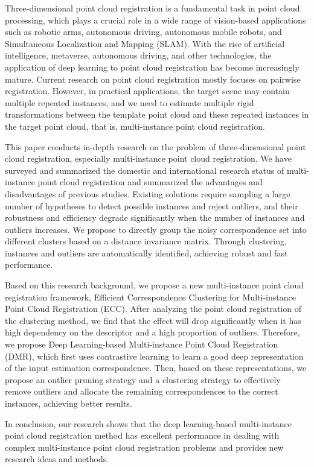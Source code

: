 \begin{abstractEn}
    Three-dimensional point cloud registration is a fundamental task in point cloud processing, which plays a crucial role in a wide range of vision-based applications such as robotic arms, autonomous driving, autonomous mobile robots, and Simultaneous Localization and Mapping (SLAM). With the rise of artificial intelligence, metaverse, autonomous driving, and other technologies, the application of deep learning to point cloud registration has become increasingly mature. Current research on point cloud registration mostly focuses on pairwise registration. However, in practical applications, the target scene may contain multiple repeated instances, and we need to estimate multiple rigid transformations between the template point cloud and these repeated instances in the target point cloud, that is, multi-instance point cloud registration.

    This paper conducts in-depth research on the problem of three-dimensional point cloud registration, especially multi-instance point cloud registration. We have surveyed and summarized the domestic and international research status of multi-instance point cloud registration and summarized the advantages and disadvantages of previous studies. Existing solutions require sampling a large number of hypotheses to detect possible instances and reject outliers, and their robustness and efficiency degrade significantly when the number of instances and outliers increases. We propose to directly group the noisy correspondence set into different clusters based on a distance invariance matrix. Through clustering, instances and outliers are automatically identified, achieving robust and fast performance.
    
    Based on this research background, we propose a new multi-instance point cloud registration framework, Efficient Correspondence Clustering for Multi-instance Point Cloud Registration (ECC). After analyzing the point cloud registration of the clustering method, we find that the effect will drop significantly when it has high dependency on the descriptor and a high proportion of outliers. Therefore, we propose Deep Learning-based Multi-instance Point Cloud Registration (DMR), which first uses contrastive learning to learn a good deep representation of the input estimation correspondence. Then, based on these representations, we propose an outlier pruning strategy and a clustering strategy to effectively remove outliers and allocate the remaining correspondences to the correct instances, achieving better results.
    
    In conclusion, our research shows that the deep learning-based multi-instance point cloud registration method has excellent performance in dealing with complex multi-instance point cloud registration problems and provides new research ideas and methods.
\end{abstractEn}
